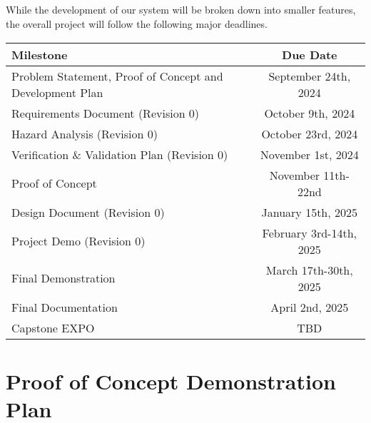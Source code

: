 \documentclass{article}
\begin{document}
\subsection*{\color{red}{Schedule}}
While the development of our system will be broken down into smaller features, the overall project will follow the following major deadlines.

\begin{center}
  \begin{tabularx}{\textwidth}{X|c}
    \textbf{Milestone} & \textbf{Due Date} \\
    \hline
    Problem Statement, Proof of Concept and Development Plan & September 24th, 2024 \\
    Requirements Document (Revision 0) & October 9th, 2024 \\
    Hazard Analysis (Revision 0) & October 23rd, 2024 \\
    Verification \& Validation Plan (Revision 0) & November 1st, 2024 \\
    Proof of Concept & November 11th-22nd \\
    Design Document (Revision 0) & January 15th, 2025 \\
    Project Demo (Revision 0) & February 3rd-14th, 2025 \\
    Final Demonstration & March 17th-30th, 2025 \\
    Final Documentation & April 2nd, 2025\\
    Capstone EXPO & TBD \\
  \end{tabularx}
\end{center}

\section{Proof of Concept Demonstration Plan}
\end{document}
